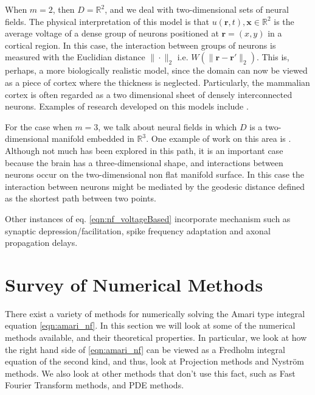 \documentclass{uonmathreport}
\begin{document}
When $m=2$, then $D = \mathbb{R}^2$, and we deal with two-dimensional sets of neural fields. The physical interpretation of this model is that $u(\mathbf{r},t), \mathbf{x} \in \mathbb{R}^2$ is the average voltage of a dense group of neurons positioned at $\mathbf{r} = (x,y)$ in a cortical region. In this case, the interaction between groups of neurons is measured with the Euclidian distance $\| \cdot\|_2$ i.e. $W(\|\mathbf{r}- \mathbf{r}' \|_2)$. This is, perhaps, a more biologically realistic model, since the domain can now be viewed as a piece of cortex where the thickness is neglected. Particularly, the mammalian cortex is often regarded as a two dimensional sheet of densely interconnected neurons. Examples of research developed on this models include \cite{owen2007bumps,rankin2014continuation,laing2003pde,laingatwo,coombes2014spots}. 

For the case when $m=3$, we talk about neural fields in which $D$ is a two-dimensional manifold embedded in $\mathbb{R}^3$. One example of work on this area is \cite{visser2017standing}. Although not much has been explored in this path, it is an important case because the brain has a three-dimensional shape, and interactions between neurons occur on the two-dimensional non flat manifold surface. In this case the interaction between neurons might be mediated by the geodesic distance defined as the shortest path between two points.

Other instances of eq. \ref{eqn:nf_voltageBased} incorporate mechanism such as synaptic depression/facilitation, spike frequency adaptation \cite{ermentrout2014spatiotemporal,coombes2003waves,coombes2014spots,laingatwo} and axonal propagation delays.

\section{Survey of Numerical Methods}\label{sec:numerical_methods}
There exist a variety of methods for numerically solving the Amari type integral equation \ref{eqn:amari_nf}. In this section we will look at some of the numerical methods available, and their theoretical properties. In particular, we look at how the right hand side of \ref{eqn:amari_nf} can be viewed as a Fredholm integral equation of the second kind, and thus, look at Projection methods and Nystr\"om methods. We also look at other methods that don't use this fact, such as Fast Fourier Transform methods, and PDE methods.
\end{document}
